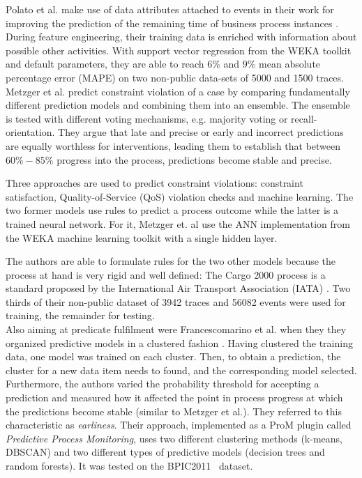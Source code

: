 Polato et al. make use of data attributes attached to events in their work for improving the prediction of the remaining time of business process instances \cite{polato2014}. During feature engineering, their training data is enriched with information about possible other activities. With support vector regression from the WEKA toolkit~\cite{web:weka} and default parameters, they are able to reach $6\%$ and $9\%$ mean absolute percentage error (MAPE) on two non-public data-sets of 5000 and 1500 traces.\\

Metzger et al. predict constraint violation of a case by comparing fundamentally different prediction models and combining them into an ensemble. The ensemble is tested with different voting mechanisms, e.g. majority voting or recall-orientation. They argue that late and precise or early and incorrect predictions are equally worthless for interventions, leading them to establish that between $60\% - 85\%$ progress into the process, predictions become stable and precise.

Three approaches are used to predict constraint violations: constraint satisfaction, Quality-of-Service (QoS) violation checks and machine learning. The two former models use rules to predict a process outcome while the latter is a trained neural network. For it, Metzger et. al use the ANN implementation from the WEKA machine learning toolkit with a single hidden layer. 

The authors are able to formulate rules for the two other models because the process at hand is very rigid and well defined: The Cargo 2000 process is a standard proposed by the International Air Transport Association (IATA) \cite{metzger2015}. Two thirds of their non-public dataset of 3942 traces and 56082 events were used for training, the remainder for testing.\\

Also aiming at predicate fulfilment were Francescomarino et al. when they they organized predictive models in a clustered fashion \cite{francescomarino2015}. Having clustered the training data, one model was trained on each cluster. Then, to obtain a prediction, the cluster for a new data item needs to found, and the corresponding model selected. Furthermore, the authors varied the probability threshold for accepting a prediction and measured how it affected the point in process progress at which the predictions become stable (similar to Metzger et al.). They referred to this characteristic as \textit{earliness}. Their approach, implemented as a ProM plugin called \textit{Predictive Process Monitoring}, uses two different clustering methods (k-means, DBSCAN) and two different types of predictive models (decision trees and random forests). It was tested on the BPIC2011~\cite{BPIC2011} dataset.

